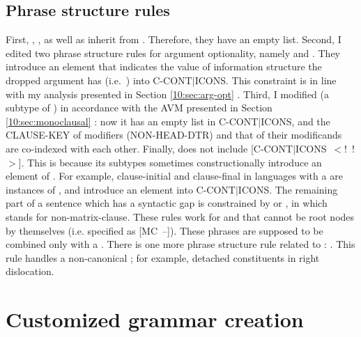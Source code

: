 \subsection{Phrase structure rules}
\label{11:ssec:phr}


First, , ,
 as well as  inherit
from . Therefore, they have an empty 
list.  Second, I edited two phrase structure rules for argument
optionality, namely
 and
. They
introduce an  element that indicates the value of
information structure the dropped argument has (i.e.\ )
into C-CONT{$\mid$}ICONS. This constraint is in line with my analysis
presented in Section \ref{10:sec:arg-opt} .  Third, I modified
 (a subtype of
) in accordance with the AVM presented in
Section \ref{10:sec:monoclausal} : now it has an
empty list in C-CONT{$\mid$}ICONS, and the CLAUSE-KEY of modifiers
(NON-HEAD-DTR) and that of their modificands are co-indexed with each
other. Finally,  does not
include \mbox{[C-CONT{$\mid$}ICONS \ensuremath{<}!
    !\ensuremath{>}]}. This is because its subtypes sometimes
constructionally introduce an element of
.
For example, clause-initial and clause-final  in languages
with a  are instances of
, and introduce an element into
C-CONT{$\mid$}ICONS.  The remaining part of a sentence which has a
syntactic gap is constrained by  or
, in which  stands for
non-matrix-clause.  These rules work for  and
 that cannot be root nodes by themselves
(i.e. specified as \mbox{[MC --]}). These phrases are supposed to be
combined only with a .  There is one more phrase
structure rule related to :
. This rule handles a non-canonical
; for example, detached constituents in right
dislocation.





\section{Customized grammar creation}
\label{11:sec:creation}

